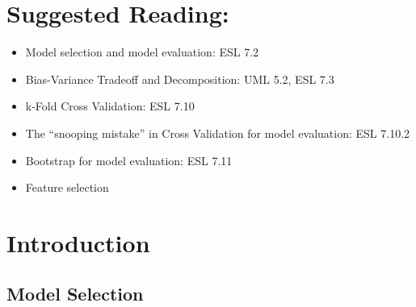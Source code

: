 \section*{Suggested Reading:}
\begin{itemize}
  \item Model selection and model evaluation: ESL 7.2
  \item Bias-Variance Tradeoff and Decomposition: UML 5.2, ESL 7.3
  \item k-Fold Cross Validation: ESL 7.10
  \item The ``snooping mistake'' in Cross Validation for model evaluation: ESL 7.10.2
  \item Bootstrap for model evaluation: ESL 7.11
  \item Feature selection
\end{itemize}


\section{Introduction}

\subsection{Model Selection}

